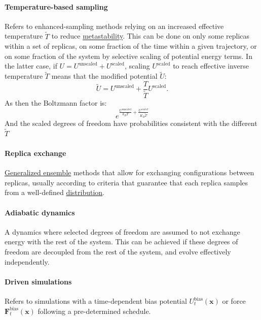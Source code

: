 \documentclass[9pt,review]{livecoms}
\newcommand{\vx}{\mathbf{x}}
\newcommand{\vF}{\mathbf{F}}
\begin{document}
\paragraph{Temperature-based sampling} Refers to enhanced-sampling methods relying on an increased effective temperature $\tilde T$ to reduce \hyperlink{ref:metastab} {metastability}. This can be done on only some replicas within a set of replicas, on some fraction of the time within a given trajectory, or on some fraction of the system by selective scaling of potential energy terms.
In the latter case, if $U = U^\mathrm{unscaled} + U^\mathrm{scaled}$, scaling $U^\mathrm{scaled}$ to reach effective inverse temperature $\tilde  T$ means that the modified potential $\tilde U$:
\begin{equation}
\tilde U = U^\mathrm{unscaled} + \frac{T}{\tilde T} U^\mathrm{scaled}.
\end{equation}
As then the Boltzmann factor is:
\begin{equation}
e^{\frac{U^\mathrm{unscaled}}{k_BT} + \frac{U^{scaled}}{K_B \tilde T}} 
\end{equation}
And the scaled degrees of freedom have probabilities consistent with the different $\tilde T$

\hypertarget{ref:ReplEx} {\paragraph{Replica exchange}} \hyperlink{ref:GenEns} {Generalized ensemble} methods that allow for exchanging configurations between replicas, usually according to criteria that guarantee that each replica samples from a well-defined \hyperlink{ref:Distribution} {distribution}. 

\hypertarget{ref:AdiabaticDyn} {\paragraph{Adiabatic dynamics}}
A dynamics where selected degrees of freedom are assumed to not exchange energy with the rest of the system.
This can be achieved if these degrees of freedom are decoupled from the rest of the system, and evolve effectively independently.

\hypertarget{ref:Driven} {\paragraph{Driven simulations}} Refers to simulations with a time-dependent bias potential $U^{\mathrm{bias}}_t(\vx)$ or force $\vF^\mathrm{bias}_t(\vx)$ following a pre-determined schedule.
\end{document}

